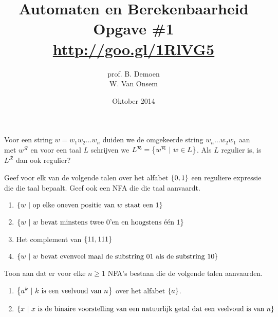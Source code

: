 \documentclass[a4paper]{article}
\title{Automaten en Berekenbaarheid\\Opgave \#1\\\url{http://goo.gl/1RlVG5}}
\author{prof. B. Demoen\\W. Van Onsem}
\date{Oktober 2014}
\newcommand{\R}{\mathcal{R}}
\begin{document}
\maketitle

\begin{question}
Voor een string $w = w_1 w_2 \ldots w_n$ duiden we de omgekeerde string $w_n \ldots w_2  w_1$ aan met $w^{\R}$ en voor een taal $L$ schrijven we $L^{\R} = \condset{w^{\R}}{w\in L}$. Als $L$ regulier is, is $L^{\R}$ dan ook regulier?
\end{question}

\begin{question}
Geef voor elk van de volgende talen over het alfabet $\left\{ 0,1 \right\}$ een reguliere expressie die die taal bepaalt. Geef ook een NFA die die taal aanvaardt.
\begin{enumerate}
  \item $\left\{ w\ |\ \mbox{op elke oneven positie van $w$ staat een $1$} \right\}$
  \item $\left\{ w\ |\ \mbox{$w$ bevat minstens twee $0$'en en hoogstens \'e\'en $1$} \right\}$
  \item Het complement van $\left\{ 11,111 \right\}$
  \item $\left\{ w\ |\ \mbox{$w$ bevat evenveel maal de substring $01$ als de substring $10$} \right\}$
\end{enumerate}
\end{question}

\begin{question}
Toon aan dat er voor elke $n \geq 1$ NFA's bestaan die de volgende talen aanvaarden.
\begin{enumerate}
  \item $\left\{ a^k\ |\ \mbox{$k$ is een veelvoud van $n$} \right\}$ over het alfabet $\left\{ a \right\}$.
  \item $\left\{ x\ |\ \mbox{$x$ is de binaire voorstelling van een natuurlijk getal dat een veelvoud is van $n$} \right\}$
\end{enumerate}
\end{question}
\end{document}
